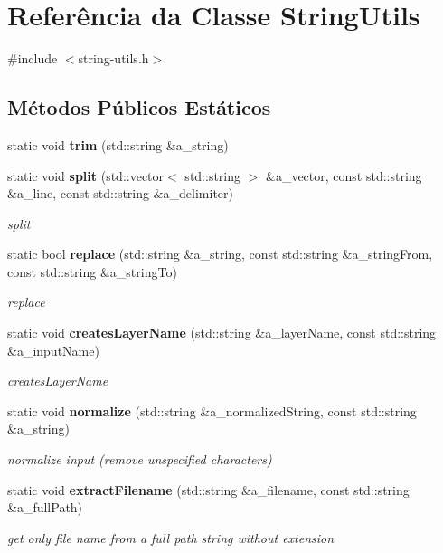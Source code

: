 \section{Referência da Classe String\+Utils}
\label{class_string_utils}


{\ttfamily \#include $<$string-\/utils.\+h$>$}

\subsection*{Métodos Públicos Estáticos}
\begin{DoxyCompactItemize}
\item 
static void {\bf trim} (std\+::string \&a\+\_\+string)
\item 
static void {\bf split} (std\+::vector$<$ std\+::string $>$ \&a\+\_\+vector, const std\+::string \&a\+\_\+line, const std\+::string \&a\+\_\+delimiter)
\begin{DoxyCompactList}\small\item\em split \end{DoxyCompactList}\item 
static bool {\bf replace} (std\+::string \&a\+\_\+string, const std\+::string \&a\+\_\+string\+From, const std\+::string \&a\+\_\+string\+To)
\begin{DoxyCompactList}\small\item\em replace \end{DoxyCompactList}\item 
static void {\bf creates\+Layer\+Name} (std\+::string \&a\+\_\+layer\+Name, const std\+::string \&a\+\_\+input\+Name)
\begin{DoxyCompactList}\small\item\em creates\+Layer\+Name \end{DoxyCompactList}\item 
static void {\bf normalize} (std\+::string \&a\+\_\+normalized\+String, const std\+::string \&a\+\_\+string)
\begin{DoxyCompactList}\small\item\em normalize input (remove unspecified characters) \end{DoxyCompactList}\item 
static void {\bf extract\+Filename} (std\+::string \&a\+\_\+filename, const std\+::string \&a\+\_\+full\+Path)
\begin{DoxyCompactList}\small\item\em get only file name from a full path string without extension \end{DoxyCompactList}\item 

\end{DoxyCompactItemize}
